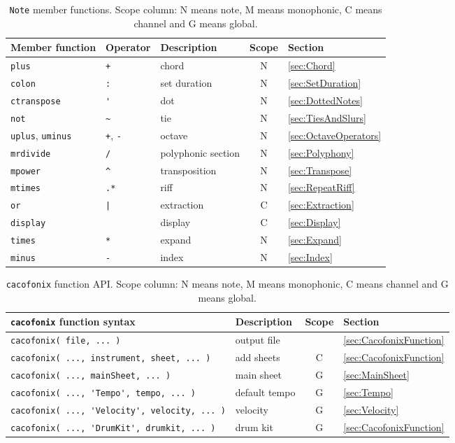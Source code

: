 \documentclass{article}
\newcommand{\note}{\lstinline!Note!\xspace}
\begin{document}
\begin{table}
	\centering
	\begin{tabular}{lllcl}
		Member function & Operator & Description & Scope & Section \\
		\hline
		\lstinline!plus! & \lstinline!+! & chord & N & \ref{sec:Chord} \\
		\lstinline!colon! & \lstinline!:! & set duration & N & \ref{sec:SetDuration} \\
		\lstinline!ctranspose! & \lstinline!'! & dot & N & \ref{sec:DottedNotes} \\
		\lstinline!not! & \lstinline!~! & tie & N & \ref{sec:TiesAndSlurs} \\
		\lstinline!uplus!, \lstinline!uminus! & \lstinline!+!, \lstinline!-! & octave & N & \ref{sec:OctaveOperators} \\
		\lstinline!mrdivide! & \lstinline!/! & polyphonic section & N & \ref{sec:Polyphony} \\
		\lstinline!mpower! & \lstinline!^! & transposition & N & \ref{sec:Transpose} \\
		\lstinline!mtimes! & \lstinline!.*! & riff & N & \ref{sec:RepeatRiff} \\
		\lstinline!or! & \lstinline!|! & extraction & C & \ref{sec:Extraction} \\
		\lstinline!display!& & display & C & \ref{sec:Display} \\
		\lstinline!times! & \lstinline!*! & expand & N & \ref{sec:Expand} \\
		\lstinline!minus! & \lstinline!-! & index & N & \ref{sec:Index} \\
	\end{tabular}
	\caption[\note member functions]{\note member functions. Scope column: N means note, M means monophonic, C means channel and G means global.}
	\label{tab:NoteFunctions}
\end{table}

\begin{table}
	\centering
	\begin{tabular}{llcl}
		\lstinline!cacofonix! function syntax & Description & Scope & Section \\
		\hline
		\lstinline!cacofonix( file, ... )! & output file & & \ref{sec:CacofonixFunction} \\
		\lstinline!cacofonix( ..., instrument, sheet, ... )! & add sheets & C & \ref{sec:CacofonixFunction} \\
		\lstinline!cacofonix( ..., mainSheet, ... )! & main sheet & G & \ref{sec:MainSheet} \\
		\lstinline!cacofonix( ..., 'Tempo', tempo, ... )! & default tempo & G & \ref{sec:Tempo} \\
		\lstinline!cacofonix( ..., 'Velocity', velocity, ... )! & velocity & G & \ref{sec:Velocity} \\
		\lstinline!cacofonix( ..., 'DrumKit', drumkit, ... )! & drum kit & G & \ref{sec:CacofonixFunction} \\
	\end{tabular}
	\caption[\lstinline!cacofonix! function API]{\lstinline!cacofonix! function API. Scope column: N means note, M means monophonic, C means channel and G means global.}
	\label{tab:CacofonixAPI}
\end{table}
\end{document}
